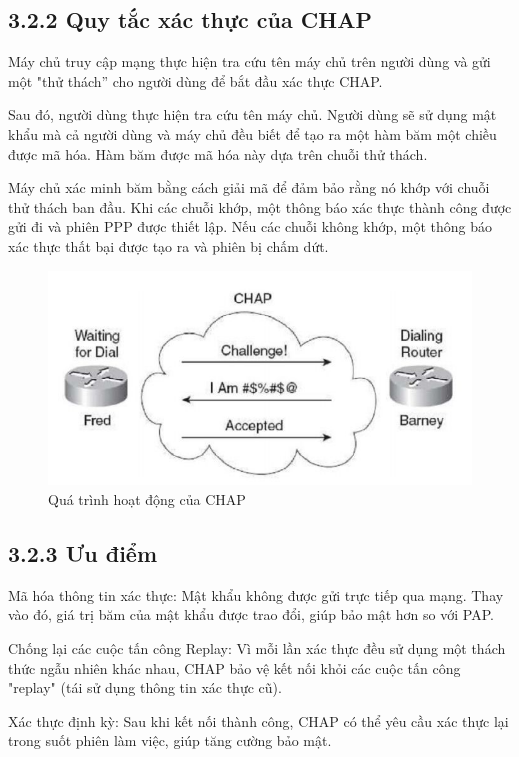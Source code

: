   \subsection*{3.2.2 Quy tắc xác thực của CHAP}

Máy chủ truy cập mạng thực hiện tra cứu tên máy chủ trên người dùng và gửi một "thử thách” cho người dùng để bắt đầu xác thực CHAP.

Sau đó, người dùng thực hiện tra cứu tên máy chủ. Người dùng sẽ sử dụng mật khẩu mà cả người dùng và máy chủ đều biết để tạo ra một hàm băm một chiều được mã hóa. Hàm băm được mã hóa này dựa trên chuỗi thử thách.

Máy chủ xác minh băm bằng cách giải mã để đảm bảo rằng nó khớp với chuỗi thử thách ban đầu. Khi các chuỗi khớp, một thông báo xác thực thành công được gửi đi và phiên PPP được thiết lập. Nếu các chuỗi không khớp, một thông báo xác thực thất bại được tạo ra và phiên bị chấm dứt.

    \begin{figure}[htbp]
        \centering
        \includegraphics[width=0.7\linewidth]{img/chap.jpeg}
        \caption{Quá trình hoạt động của CHAP}
    \end{figure}

  \subsection*{3.2.3 Ưu điểm}

 Mã hóa thông tin xác thực: Mật khẩu không được gửi trực tiếp qua mạng. Thay vào đó, giá trị băm của mật khẩu được trao đổi, giúp bảo mật hơn so với PAP.
 
Chống lại các cuộc tấn công Replay: Vì mỗi lần xác thực đều sử dụng một thách thức ngẫu nhiên khác nhau, CHAP bảo vệ kết nối khỏi các cuộc tấn công "replay" (tái sử dụng thông tin xác thực cũ).

Xác thực định kỳ: Sau khi kết nối thành công, CHAP có thể yêu cầu xác thực lại trong suốt phiên làm việc, giúp tăng cường bảo mật.


